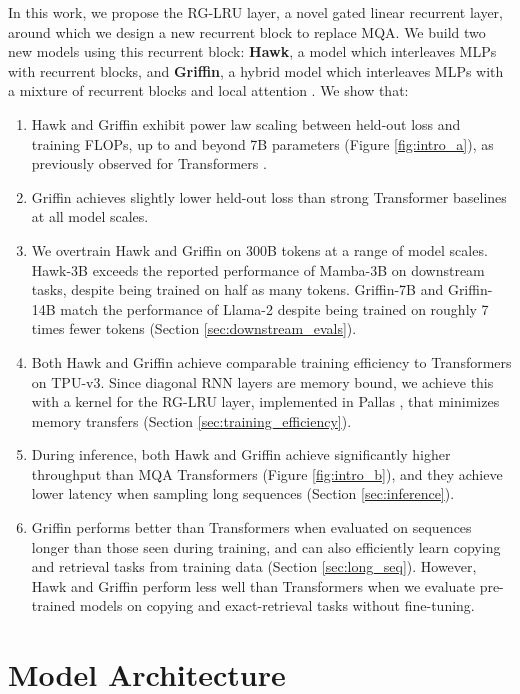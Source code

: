 In this work, we propose the RG-LRU layer, a novel gated linear recurrent layer, around which we design a new recurrent block to replace MQA. We build two new models using this recurrent block: \textbf{Hawk}, a model which interleaves MLPs with recurrent blocks, and \textbf{Griffin}, a hybrid model which interleaves MLPs with a mixture of recurrent blocks and local attention \citep{beltagy2020longformer}. We show that:

\begin{enumerate}
    \item Hawk and Griffin exhibit power law scaling between held-out loss and training FLOPs, up to and beyond 7B parameters (Figure \ref{fig:intro_a}), as previously observed for Transformers \citep{kaplan2020scaling}. 
    \item Griffin achieves slightly lower held-out loss than strong Transformer baselines at all model scales. 
    \item We overtrain Hawk and Griffin on 300B tokens at a range of model scales. Hawk-3B exceeds the reported performance of Mamba-3B \citep{gu2023mamba} on downstream tasks, despite being trained on half as many tokens. Griffin-7B and Griffin-14B match the performance of Llama-2 \citep{touvron2023llama} despite being trained on roughly 7 times fewer tokens (Section \ref{sec:downstream_evals}). 
    \item Both Hawk and Griffin achieve comparable training efficiency to Transformers on TPU-v3. Since diagonal RNN layers are memory bound, we achieve this with a kernel for the RG-LRU layer, implemented in Pallas \citep{jax2018github}, that minimizes memory transfers (Section \ref{sec:training_efficiency}). 
    \item During inference, both Hawk and Griffin achieve significantly higher throughput than MQA Transformers (Figure \ref{fig:intro_b}), and they achieve lower latency when sampling long sequences (Section \ref{sec:inference}). 
    \item Griffin performs better than Transformers when evaluated on sequences longer than those seen during training, and can also efficiently learn copying and retrieval tasks from training data (Section \ref{sec:long_seq}). However, Hawk and Griffin perform less well than Transformers when we evaluate pre-trained models on copying and exact-retrieval tasks without fine-tuning.
\end{enumerate}

\section{Model Architecture}
\label{sec:model}

